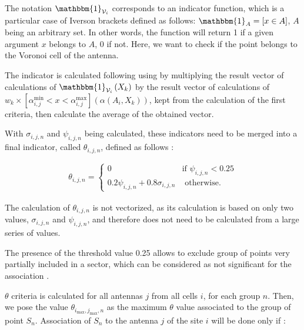 \documentclass[a4paper, 11pt]{report}
\begin{document}
    The notation $\mathbbm{1}_{\mathcal{V}_i}$ corresponds to an indicator function, which is a particular case of Iverson brackets defined as follows: $\mathbbm{1}_A = [x \in A]$, $A$ being an arbitrary set. In other words, the function will return 1 if a given argument $x$ belongs to $A$, 0 if not. Here, we want to check if the point belongs to the Voronoi cell of the antenna. \newline
    
    The indicator is calculated following using by multiplying the result vector of calculations of $\mathbbm{1}_{\mathcal{V}_i}\left(X_k\right)$ by the result vector of calculations of $w_k \times \left[\alpha^\text{min}_{i, j} < x < \alpha^\text{max}_{i, j}\right]\left(\alpha\left(A_i,X_k\right)\right)$, kept from the calculation of the first criteria, then calculate the average of the obtained vector. \newline
    
    With $\sigma_{i, j, n}$ and $\psi_{i, j, n}$ being calculated, these indicators need to be merged into a final indicator, called $\theta_{i, j, n}$, defined as follows \cite{trieu_visualization_2019}:
    
    \begin{align}
        \theta_{i, j, n} = \begin{cases}
        0  & \text {if }\psi_{i,j,n}<0.25 \\
        0.2 \psi_{i,j,n} + 0.8 \sigma_{i,j,n} & \text{ otherwise.}
        \end{cases}
    \end{align}
    
    The calculation of $\theta_{i, j, n}$ is not vectorized, as its calculation is based on only two values, $\sigma_{i, j, n}$ and $\psi_{i, j, n}$, and therefore does not need to be calculated from a large series of values. \newline
    
    The presence of the threshold value 0.25 allows to exclude group of points very partially included in a sector, which can be considered as not significant for the association \cite{trieu_visualization_2019}. \newline
    
    $\theta$ criteria is calculated for all antennas $j$ from all cells $i$, for each group $n$. Then, we pose the value $\theta_{i_\text{max}, j_\text{max}, n}$ as the maximum $\theta$ value associated to the group of point $S_n$. Association of $S_n$ to the antenna $j$ of the site $i$ will be done only if \cite{trieu_visualization_2019}:
    
\end{document}
